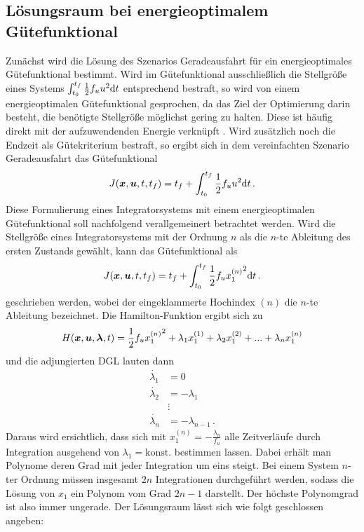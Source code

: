\subsection{Lösungsraum bei energieoptimalem Gütefunktional}
Zunächst wird die Lösung des Szenarios Geradeausfahrt für ein energieoptimales Gütefunktional bestimmt. Wird im Gütefunktional ausschließlich die Stellgröße eines Systems $\int_{t_0}^{t_f}\frac{1}{2}f_uu^2\textrm{d}{t}$ entsprechend bestraft, so wird von einem energieoptimalen Gütefunktional gesprochen, da das Ziel der Optimierung darin besteht, die benötigte Stellgröße möglichst gering zu halten. Diese ist häufig direkt mit der aufzuwendenden Energie verknüpft \cite{KnutGraichen.2012}. Wird zusätzlich noch die Endzeit als Gütekriterium bestraft, so ergibt sich in dem vereinfachten Szenario Geradeausfahrt das Gütefunktional
\begin{equation}
	J(\boldsymbol{x},\boldsymbol{u},t,t_f) = t_f + \int_{t_0}^{t_f}\frac{1}{2}f_uu^2\textrm{d}{t}\,.
\end{equation}
Diese Formulierung eines Integratorsystems mit einem energieoptimalen Gütefunktional soll nachfolgend verallgemeinert betrachtet werden. Wird die Stellgröße eines Integratorsystems mit der Ordnung $n$ als die $n$-te Ableitung des ersten Zustands gewählt, kann das Gütefunktional als 
\begin{equation}
J(\boldsymbol{x},\boldsymbol{u},t,t_f) = t_f + \int_{t_0}^{t_f}\frac{1}{2}f_u{x_1^{(n)}}^2\textrm{d}{t}\,.
\end{equation}
geschrieben werden, wobei der eingeklammerte Hochindex $(n)$ die $n$-te Ableitung bezeichnet. Die Hamilton-Funktion ergibt sich zu
\begin{equation}
H(\boldsymbol{x},\boldsymbol{u},\boldsymbol{\lambda},t) = \frac{1}{2}f_u{x_1^{(n)}}^2 + \lambda_1x_1^{(1)} + \lambda_2x_1^{(2)} + ... + \lambda_nx_1^{(n)}
\end{equation}
und die adjungierten \gls{DGL} lauten dann  
\begin{align}
	\dot{\lambda_1} &= 0 \\
	\dot{\lambda_2} &= -\lambda_1 \\
	&\vdots \\
	\dot{\lambda_n} &= -\lambda_{n-1}\,.
\end{align}
Daraus wird ersichtlich, dass sich mit $x_1^{(n)} = -\frac{\lambda_n}{f_u}$ alle Zeitverläufe durch Integration ausgehend von $\lambda_1 = \textrm{konst.}$ bestimmen lassen. Dabei erhält man Polynome deren Grad mit jeder Integration um eins steigt. Bei einem System $n$-ter Ordnung müssen insgesamt $2n$ Integrationen durchgeführt werden, sodass die Lösung von $x_1$ ein Polynom vom Grad $2n-1$ darstellt. Der höchste Polynomgrad ist also immer ungerade. Der Lösungsraum lässt sich wie folgt geschlossen angeben: 

